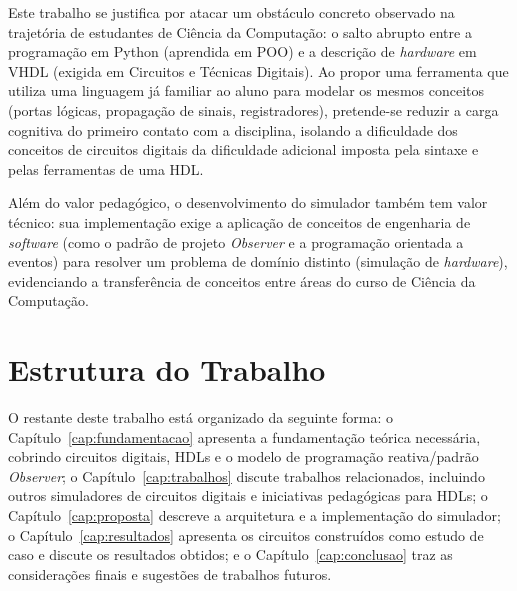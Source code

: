 Este trabalho se justifica por atacar um obstáculo concreto observado na trajetória de estudantes de Ciência da Computação: o salto abrupto entre a programação em Python (aprendida em POO) e a descrição de \textit{hardware} em VHDL (exigida em Circuitos e Técnicas Digitais). Ao propor uma ferramenta que utiliza uma linguagem já familiar ao aluno para modelar os mesmos conceitos (portas lógicas, propagação de sinais, registradores), pretende-se reduzir a carga cognitiva do primeiro contato com a disciplina, isolando a dificuldade dos conceitos de circuitos digitais da dificuldade adicional imposta pela sintaxe e pelas ferramentas de uma HDL.

Além do valor pedagógico, o desenvolvimento do simulador também tem valor técnico: sua implementação exige a aplicação de conceitos de engenharia de \textit{software} (como o padrão de projeto \textit{Observer} e a programação orientada a eventos) para resolver um problema de domínio distinto (simulação de \textit{hardware}), evidenciando a transferência de conceitos entre áreas do curso de Ciência da Computação.

\section{Estrutura do Trabalho}

O restante deste trabalho está organizado da seguinte forma: o Capítulo~\ref{cap:fundamentacao} apresenta a fundamentação teórica necessária, cobrindo circuitos digitais, HDLs e o modelo de programação reativa/padrão \textit{Observer}; o Capítulo~\ref{cap:trabalhos} discute trabalhos relacionados, incluindo outros simuladores de circuitos digitais e iniciativas pedagógicas para HDLs; o Capítulo~\ref{cap:proposta} descreve a arquitetura e a implementação do simulador; o Capítulo~\ref{cap:resultados} apresenta os circuitos construídos como estudo de caso e discute os resultados obtidos; e o Capítulo~\ref{cap:conclusao} traz as considerações finais e sugestões de trabalhos futuros.
